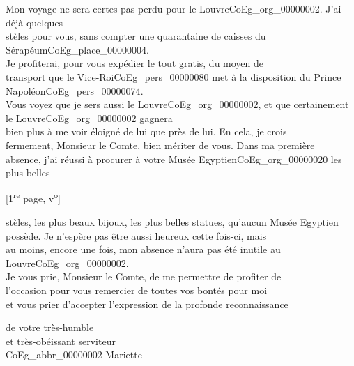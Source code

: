 \documentclass{book}
\begin{document}
\indent Mon voyage ne sera certes pas perdu pour le Louvre\gls{CoEg_org_00000002}. J’ai déjà quelques\\
stèles pour vous, sans compter une quarantaine de caisses du Sérapéum\gls{CoEg_place_00000004}.\\
Je profiterai, pour vous expédier le tout gratis, du moyen de\\
transport que le Vice-Roi\gls{CoEg_pers_00000080} met à la disposition du Prince Napoléon\gls{CoEg_pers_00000074}.\\
Vous voyez que je sers aussi le Louvre\gls{CoEg_org_00000002}, et que certainement le Louvre\gls{CoEg_org_00000002} gagnera\\
bien plus à me voir éloigné de lui que près de lui. En cela, je crois\\
fermement, Monsieur le Comte, bien mériter de vous. Dans ma première\\
absence, j’ai réussi à procurer à votre Musée Egyptien\gls{CoEg_org_00000020} les plus belles
{\footnotesize \begin{center} {[1\textsuperscript{re} page, v\textsuperscript{o}]}\end{center}}
\noindent stèles, les plus beaux bijoux, les plus belles statues, qu’aucun Musée Egyptien\\
possède. Je n’espère pas être aussi heureux cette fois-ci, mais\\
au moins, encore une fois, mon absence n’aura pas été inutile au\\
Louvre\gls{CoEg_org_00000002}.\\
\indent Je vous prie, Monsieur le Comte, de me permettre de profiter de\\
l’occasion pour vous remercier de toutes vos bontés pour moi\\
et vous prier d’accepter l’expression de la profonde reconnaissance
\begin{center}\hspace{5cm}de votre très-humble\\
\hspace{5cm}et très-obéissant serviteur\\
\hspace{5cm} \gls{CoEg_abbr_00000002} Mariette\end{center}
\hypertarget{CoEg_Mariette_1858-01-23}{}
\end{document}
